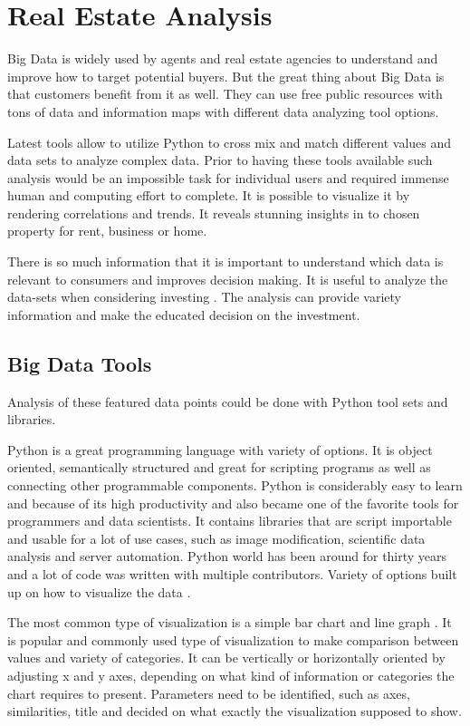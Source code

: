 \documentclass[sigconf]{acmart}
\begin{document}
\section{Real Estate Analysis}

Big Data is widely used by agents and real estate agencies to understand and improve how to target potential buyers. But the great thing about Big Data is that customers benefit from it as well. They can use free public resources with tons of data and information maps with different data analyzing tool options.

Latest tools allow to utilize Python to cross mix and match different values and data sets to analyze complex data. Prior to having these tools available such analysis would be an impossible task for individual users and required immense human and computing effort to complete. It is possible to visualize it by rendering correlations and trends. It reveals stunning insights in to chosen property for rent, business or home. 

There is so much information that it is important to understand which data is relevant to consumers and improves decision making. It is useful to analyze the data-sets when considering investing \cite{investopia}. The analysis can provide variety information and make the educated decision on the investment.

\subsection{Big Data Tools}

Analysis of these featured data points could be done with Python tool sets and libraries.

Python is a great programming language with variety of options. It is object oriented, semantically structured and great for scripting programs as well as connecting other programmable components. Python is considerably easy to learn and because of its high productivity and also became one of the favorite tools for programmers and data scientists. It contains libraries that are script importable and usable for a lot of use cases, such as image modification, scientific data analysis and server automation. Python world has been around for thirty years and a lot of code was written with multiple contributors. Variety of options built up on how to visualize the data \cite{van2011python}.

The most common type of visualization is a simple bar chart and line graph \cite{robbins2012creating}. It is popular and commonly used type of visualization to make comparison between values and variety of categories. It can be vertically or horizontally oriented by adjusting x and y axes, depending on what kind of information or categories the chart requires to  present. Parameters need to be identified, such as axes, similarities, title and decided on what exactly the visualization supposed to show.
\end{document}
